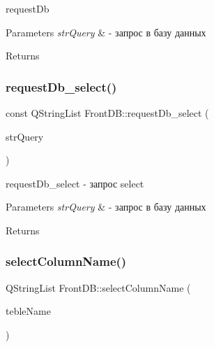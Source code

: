 request\+Db 


\begin{DoxyParams}{Parameters}
{\em str\+Query} & -\/ запрос в базу данных \\
\hline
\end{DoxyParams}
\begin{DoxyReturn}{Returns}

\end{DoxyReturn}
\mbox{\label{classFrontDB_a7cb7bf22db3101bdb02a8f68c0379ee3}} 
\subsubsection{\texorpdfstring{request\+Db\+\_\+select()}{requestDb\_select()}}
{\footnotesize\ttfamily const Q\+String\+List Front\+D\+B\+::request\+Db\+\_\+select (\begin{DoxyParamCaption}\item[{const Q\+String \&}]{str\+Query }\end{DoxyParamCaption})}



request\+Db\+\_\+select -\/ запрос select 


\begin{DoxyParams}{Parameters}
{\em str\+Query} & -\/ запрос в базу данных \\
\hline
\end{DoxyParams}
\begin{DoxyReturn}{Returns}

\end{DoxyReturn}
\mbox{\label{classFrontDB_a6245bace114b88f4cb29bf7c6b7da9f9}} 
\subsubsection{\texorpdfstring{select\+Column\+Name()}{selectColumnName()}}
{\footnotesize\ttfamily Q\+String\+List Front\+D\+B\+::select\+Column\+Name (\begin{DoxyParamCaption}\item[{const Q\+String \&}]{teble\+Name }\end{DoxyParamCaption})}



